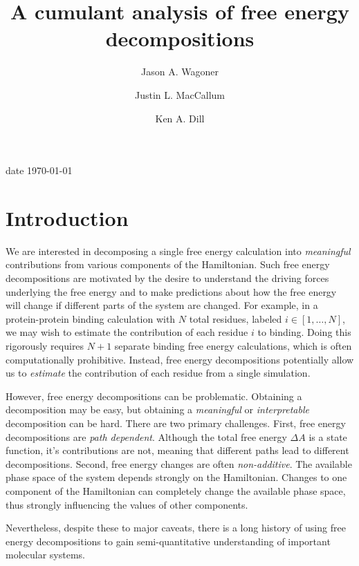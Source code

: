 \documentclass[%
 preprint,
 amsmath,amssymb,
 aps,
]{revtex4-1}
\begin{document}
\title{A cumulant analysis of free energy decompositions}
\author{Jason A. Wagoner}
\author{Justin L. MacCallum}
\author{Ken A. Dill}

date{ \today}


\begin{abstract}

\end{abstract}

\maketitle

\section{Introduction}


We are interested in decomposing a single free energy calculation into \emph{meaningful} contributions from various components of the Hamiltonian. Such free energy decompositions are motivated by the desire to understand the driving forces underlying the free energy and to make predictions about how the free energy will change if different parts of the system are changed. For example, in a protein-protein binding calculation with $N$ total residues, labeled $i \in \left[1, \dots, N \right]$, we may wish to estimate the contribution of each residue $i$ to binding. Doing this rigorously requires $N+1$ separate binding free energy calculations, which is often computationally prohibitive. Instead, free energy decompositions potentially allow us to \emph{estimate} the contribution of each residue from a single simulation.

However, free energy decompositions can be problematic. Obtaining a decomposition may be easy, but obtaining a \emph{meaningful} or \emph{interpretable} decomposition can be hard. There are two primary challenges. First, free energy decompositions are \emph{path dependent}. Although the total free energy $\Delta A$ is a state function, it's contributions are not, meaning that different paths lead to different decompositions. Second, free energy changes are often \emph{non-additive}. The available phase space of the system depends strongly on the Hamiltonian. Changes to one component of the Hamiltonian can completely change the available phase space, thus strongly influencing the values of other components.

Nevertheless, despite these to major caveats, there is a long history of using free energy decompositions to gain semi-quantitative understanding of important molecular systems.
\end{document}
